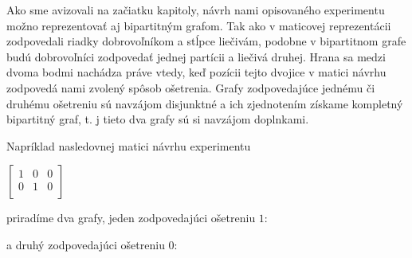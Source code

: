 Ako sme avizovali na začiatku kapitoly, návrh nami opisovaného experimentu možno reprezentovať aj bipartitným grafom.
Tak ako v maticovej reprezentácii zodpovedali riadky dobrovoľníkom a stĺpce liečivám, podobne v bipartitnom grafe budú dobrovoľníci 
zodpovedať jednej partícii a liečivá druhej. Hrana sa medzi dvoma bodmi nachádza práve vtedy, keď pozícii tejto dvojice v matici návrhu zodpovedá nami zvolený spôsob ošetrenia.
Grafy zodpovedajúce jednému či druhému ošetreniu sú navzájom disjunktné a ich zjednotením získame kompletný bipartitný graf, t. j tieto dva grafy sú si navzájom doplnkami.

Napríklad nasledovnej matici návrhu experimentu

\begin{center}
$
\begin{bmatrix}
1 & 0 & 0 \\
0 & 1 & 0 \\
\end{bmatrix}
$
\end{center}

priradíme dva grafy, jeden zodpovedajúci ošetreniu $1$:

\begin{center}


\end{center}

a druhý zodpovedajúci ošetreniu $0$:

